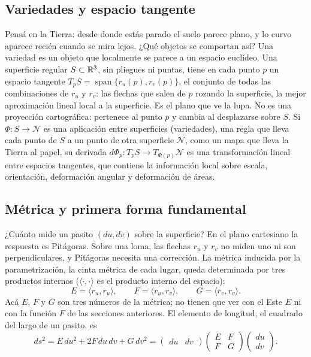\subsection{Variedades y espacio tangente}\label{sec:variedades}

Pensá en la Tierra: desde donde estás parado el suelo parece plano, y lo curvo aparece recién
cuando se mira lejos. ¿Qué objetos se comportan así? Una variedad es un objeto que localmente
se parece a un espacio euclídeo. Una superficie regular \(S\subset\mathbb{R}^3\), sin pliegues ni puntas, tiene en cada punto
\(p\) un espacio tangente \(T_pS=\operatorname{span}\{r_u(p),r_v(p)\}\), el conjunto de todas
las combinaciones de \(r_u\) y \(r_v\): las flechas que salen de \(p\) rozando la superficie, la
mejor aproximación lineal local a la superficie. Es el plano que ve la lupa. No es una
proyección cartográfica: pertenece al punto \(p\) y cambia al desplazarse sobre \(S\). Si
\(\Phi\colon S\to\mathcal N\) es una aplicación entre superficies (variedades), una regla que
lleva cada punto de \(S\) a un punto de otra superficie \(\mathcal N\), como un mapa que lleva
la Tierra al papel, su derivada \(d\Phi_p\colon T_pS\to T_{\Phi(p)}\mathcal N\) es una
transformación lineal entre espacios tangentes, que contiene la información local sobre
escala, orientación, deformación angular y deformación de áreas.

\subsection{Métrica y primera forma fundamental}\label{sec:metrica}

¿Cuánto mide un pasito \((du,dv)\) sobre la superficie? En el plano cartesiano la respuesta es
Pitágoras. Sobre una loma, las flechas \(r_u\) y \(r_v\) no miden uno ni son perpendiculares, y
Pitágoras necesita una corrección. La métrica inducida por la parametrización, la cinta métrica
de cada lugar, queda determinada por tres productos internos (\(\langle\cdot,\cdot\rangle\) es
el producto interno del espacio):
\[
  E=\langle r_u,r_u\rangle,\qquad
  F=\langle r_u,r_v\rangle,\qquad
  G=\langle r_v,r_v\rangle.
\]
Acá \(E\), \(F\) y \(G\) son tres números de la métrica; no tienen que ver con el Este \(E\) ni
con la función \(F\) de las secciones anteriores. El elemento de longitud, el cuadrado del largo de un pasito, es
\[
  \boxed{ds^2=E\,du^2+2F\,du\,dv+G\,dv^2}
  =\begin{pmatrix}du&dv\end{pmatrix}
  \begin{pmatrix}E&F\\F&G\end{pmatrix}
  \begin{pmatrix}du\\dv\end{pmatrix}.
\]


